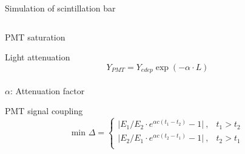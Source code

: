 \documentclass[compress, 13pt, aspectratio=169]{beamer}
\begin{document}
\begin{frame}{Simulation of scintillation bar}
\begin{columns}
\begin{column}{0.5\textwidth}
\begin{block}{\small PMT saturation\footnotemark}
\begin{figure}[t]
                \end{figure}
            \end{block}
            \pause
            \vspace*{-0.2cm}
            \begin{block}{\small Light attenuation}
            \vspace*{-0.2cm}
            {
                \small$$Y_{PMT} = Y_{edep} \exp (-\alpha \cdot L)$$
            }
            \vspace*{-0.7cm}\\
            {\footnotesize$\alpha$: Attenuation factor}
            \end{block}
            \pause
            \vspace*{-0.2cm}
            \begin{block}{\small PMT signal coupling}
            {
                \small
                \vspace*{-0.5cm}
                $$\text{min }\Delta = 
                \begin{cases}
                    \lvert E_1/E_2 \cdot e^{\alpha c (t_1-t_2)} -1\rvert\ ,& t_1>t_2\\
                    \lvert E_2/E_1 \cdot e^{\alpha c (t_2-t_1)} -1\rvert\ ,& t_2>t_1\\
                \end{cases}$$
            }
            \end{block}
        \end{column}
    \end{columns}
\end{frame}
\end{document}

